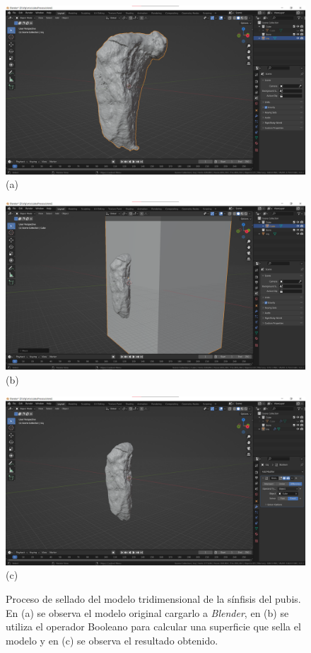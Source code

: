 \begin{figure}[p]
    \centering
    \includegraphics[width=0.8\linewidth]{imagenes/planningAndImplementation/1.png}
    \\ (a)

    \includegraphics[width=0.8\linewidth]{imagenes/planningAndImplementation/2.png}
    \\ (b)
    
    \includegraphics[width=0.8\linewidth]{imagenes/planningAndImplementation/4.png}
    \\ (c)
    
    \caption[Proceso de sellado de la malla 3D de la sínfisis del pubis]{Proceso de sellado del modelo tridimensional de la sínfisis del pubis. En (a) se observa el modelo original cargarlo a \textit{Blender}, en (b) se utiliza el operador Booleano para calcular una superficie que sella el modelo y en (c) se observa el resultado obtenido.}
    \label{fig:boneProcess}
\end{figure}


